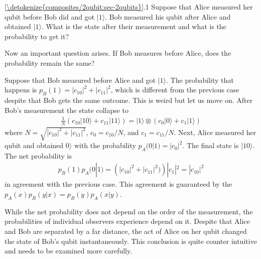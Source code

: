 \documentclass[letterpaper,10pt,english]{jupyterBook}
\begin{document}
\sphinxAtStartPar
{}  \hyperref[\detokenize{composites/2qubit:sec-2qubits}]{\ref{\detokenize{composites/2qubit:sec-2qubits}}}.1 Suppose that Alice measured her qubit before Bob did and got \(|1\rangle\).  Bob measured his qubit after Alice and obtained \(|1\rangle\).  What is the state after their measurement and what is the probability to get it?

\sphinxAtStartPar
Now an important question arises. If Bob measures before Alice, does the probability remain the same?

\sphinxAtStartPar
Suppose that Bob measured before Alice and got \(|1\rangle\).  The probability that happens is \(p_B(1)=|c_{10}|^2 + |c_{11}|^2\), which is different from the previous case despite that Bob gets the same outcome.   This is weird but let us move on.  After Bob’s measurement the state collapse to
\begin{equation}\label{equation:composites/2qubit:superposition-q2}
\begin{split}
\frac{1}{N} (c_{10} |10\rangle + c_{11} |11\rangle) = |1\rangle \otimes \left(c_0 |0\rangle + c_1|1\rangle\right)
\end{split}
\end{equation}
\sphinxAtStartPar
where \(N = \sqrt{|c_{10}|^2 + |c_{11}|^2}\), \(c_0=c_{10}/N\), and \(c_1=c_{11}/N\).
Next, Alice measured her qubit and obtained \(0\rangle\) with the probability \(p_A(0|1)=|c_0|^2\).  The final state is \(|10\rangle\).  The net probability is
\begin{equation*}
\begin{split}
p_B(1) p_A(0|1) = \left(|c_{10}|^2 + |c_{11}|^2)\right) |c_1|^2 = |c_{10}|^2
\end{split}
\end{equation*}
\sphinxAtStartPar
in agreement with the previous case.  This agreement is guaranteed by the  \(p_A(x)p_B(y|x) = p_B(y) p_A(x|y)\).

\sphinxAtStartPar
While the net probability does not depend on the order of the measurement, the probabilities of individual observers experience depend on it. Despite that Alice and Bob are separated by a far distance, the act of Alice on her qubit changed the state of Bob’s qubit instantaneously.  This conclusion is quite counter intuitive and needs to be examined more carefully.
\end{document}
